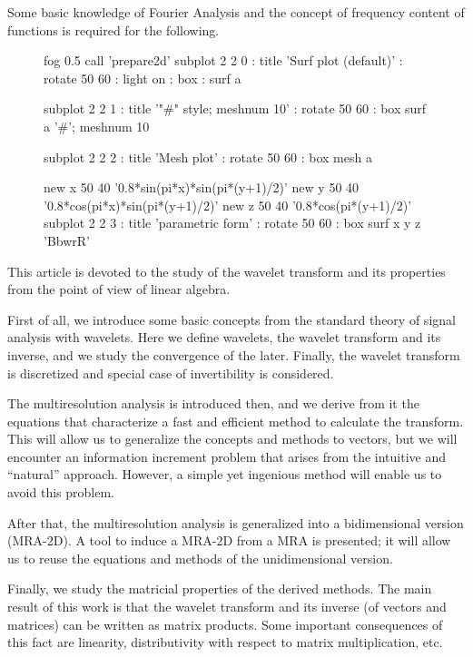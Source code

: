 \documentclass[letterpaper,10pt]{article}
\begin{document}
  Some basic knowledge of Fourier Analysis and the concept of frequency content of functions is required for the following.
  \begin{figure}[!ht]
    \centering
    \begin{mgl}[width=0.85\textwidth,height=7.5cm]
      fog 0.5
      call 'prepare2d'
      subplot 2 2 0 : title 'Surf plot (default)' : rotate 50 60 : light on : box : surf a
      
      subplot 2 2 1 : title '"\#" style; meshnum 10' : rotate 50 60 : box
      surf a '#'; meshnum 10
      
      subplot 2 2 2 : title 'Mesh plot' : rotate 50 60 : box
      mesh a
      
      new x 50 40 '0.8*sin(pi*x)*sin(pi*(y+1)/2)'
      new y 50 40 '0.8*cos(pi*x)*sin(pi*(y+1)/2)'
      new z 50 40 '0.8*cos(pi*(y+1)/2)'
      subplot 2 2 3 : title 'parametric form' : rotate 50 60 : box
      surf x y z 'BbwrR'
    \end{mgl}
  \end{figure}
  
  \noindent This article is devoted to the study of the wavelet transform and its properties from the point of view of linear algebra.
  
  First of all, we introduce some basic concepts from the standard theory of signal analysis with wavelets. Here we define wavelets, the wavelet transform and its inverse, and we study the convergence of the later. Finally, the wavelet transform is discretized and special case of invertibility is considered.
  
  The multiresolution analysis is introduced then, and we derive from it the equations that characterize a fast and efficient method to calculate the transform. This will allow us to generalize the concepts and methods to vectors, but we will encounter an information increment problem that arises from the intuitive and ``natural'' approach. However, a simple yet ingenious method will enable us to avoid this problem.
  
  After that, the multiresolution analysis is generalized into a bidimensional version (MRA-2D). A tool to induce a MRA-2D from a MRA is presented; it will allow us to reuse the equations and methods of the unidimensional version.
  
  Finally, we study the matricial properties of the derived methods. The main result of this work is that the wavelet transform and its inverse (of vectors and matrices) can be written as matrix products. Some important consequences of this fact are linearity, distributivity with respect to matrix multiplication, etc.
  
\end{document}
